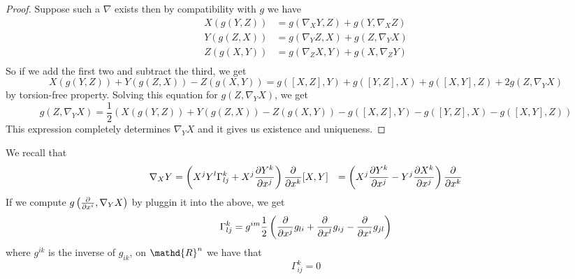 \documentclass[a4paper]{article}
\begin{document}
\begin{proof}
  Suppose such a $\nabla$ exists then by compatibility with $g$ we have 
  \[
    \begin{aligned}
      X \left( g \left( Y, Z \right) \right) &= g \left( \nabla_X Y, Z \right) + g \left( Y, \nabla_X Z \right) \\
      Y \left( g \left( Z, X \right) \right) &= g \left( \nabla_Y Z, X \right) + g \left( Z, \nabla_Y X \right) \\
      Z \left( g \left( X, Y \right) \right) &= g \left( \nabla_Z X, Y \right) + g \left( X, \nabla_Z Y \right) \\
    \end{aligned}
  \]
  So if we add the first two and subtract the third, we get
  \[
    X(g(Y,Z)) + Y(g(Z,X)) - Z(g(X,Y)) = g([X,Z], Y) + g([Y,Z], X) + g([X,Y],Z) + 2 g (Z, \nabla_Y X)
  \]
  by torsion-free property. Solving this equation for $g(Z, \nabla_Y X)$, we get 
  \[
    g(Z, \nabla_Y X) = \frac{1}{2}  \left( X(g(Y,Z)) + Y(g(Z,X)) - Z(g(X,Y)) - g([X,Z], Y) - g([Y,Z], X) - g([X,Y], Z) \right) 
  \]
  This expression completely determines $\nabla_Y X$ and it gives us existence and uniqueness.
\end{proof}
We recall that
\[
  \begin{aligned}
    \nabla_X Y &= \left(X^jY^l \Gamma_{lj}^k + X^j \pdv{Y^k}{x^j}\right) \pdv{x^k}
    [X,Y] &= \left( X^j \pdv{Y^k}{x^j} - Y^j \pdv{X^k}{x^j} \right) \pdv{x^k}
  \end{aligned}
\]
If we compute $g \left( \pdv{x^i}, \nabla_Y X \right)$ by pluggin it into the above, we get
\[
  \Gamma_{lj}^k = g^{im} \frac{1}{2} \left( \pdv{x^j}g_{li} + \pdv{x^l}g_{ij} - \pdv{x^i}g_{jl} \right)
\]
where $g^{ik}$ is the inverse of $g_{ik}$, on $\mathd{R}^n$ we have that
\[
  \Gamma_{ij}^k = 0
\]
\end{document}
